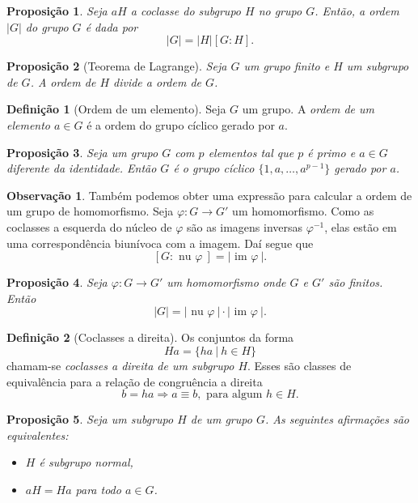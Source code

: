\documentclass[a4paper,12pt]{report}
\theoremstyle{plain}
\newtheorem{proposicao}{Proposição}[section]
\theoremstyle{definition}
\newtheorem{definicao}{Definição}[section]
\newtheorem{observacao}{Observação}[section]
\begin{document}
\begin{proposicao}
	Seja \(aH\) a coclasse do subgrupo \(H\) no grupo
	\(G\). Então, a ordem \(|G|\) do grupo \(G\) é dada por
	\[|G| = |H|[G:H].\]	
\end{proposicao}

\begin{proposicao}[Teorema de Lagrange]
	Seja \(G\) um grupo finito e
	\(H\) um subgrupo de \(G\). A ordem de \(H\) divide a ordem de \(G\).
\end{proposicao}

\begin{definicao}[Ordem de um elemento]
	Seja \(G\) um grupo. A \emph{ordem de um elemento \(a\in G\)} é a ordem do grupo cíclico gerado por \(a\).	
\end{definicao}

\begin{proposicao}
	Seja um grupo \(G\) com \(p\) elementos tal que
	\(p\) é primo e \(a\in G\) diferente da identidade. Então \(G\) é o
	grupo cíclico \(\{1,a,\dots,a^{p-1}\}\) gerado por \(a\).
\end{proposicao}

\begin{observacao}
	Também podemos obter uma expressão para calcular a ordem de um grupo de
	homomorfismo. Seja \(\varphi: G\longrightarrow G'\) um homomorfismo.
	Como as coclasses a esquerda do núcleo de \(\varphi\) são as imagens
	inversas \(\varphi^{-1}\), elas estão em uma correspondência biunívoca
	com a imagem. Daí segue que
	\[[G:\text{ nu }\varphi\ ] = |\text{ im }\varphi\ |.\]
\end{observacao}

\begin{proposicao}
	Seja \(\varphi: G\longrightarrow G'\) um
	homomorfismo onde \(G\) e \(G'\) são finitos. Então
	\[|G| = |\text{ nu }\varphi\ |\cdot|\text{ im }\varphi\ |.\]	
\end{proposicao}

\begin{definicao}[Coclasses a direita]
	Os conjuntos da forma
	\[Ha = \{ha \ | \ h \in H\}\] chamam-se \emph{coclasses a direita de um
		subgrupo \(H\)}. Esses são classes de equivalência para a relação de
	congruência a direita
	\[b = ha \Rightarrow a \equiv b, \text{ para algum }h \in H.\]	
\end{definicao}

\begin{proposicao}
	Seja um subgrupo \(H\) de um grupo \(G\). As
	seguintes afirmações são equivalentes:
	
	\begin{itemize}
		\item
		\(H\) é subgrupo normal,
		\item
		\(aH = Ha\) para todo \(a\in G\).
	\end{itemize}	
\end{proposicao}
\end{document}
